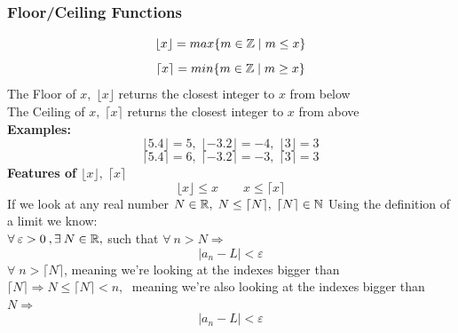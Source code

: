 \subsubsection{Floor/Ceiling Functions}
\[
    \lfloor x\rfloor = max\{m\in \mathbb{Z}\;|\; m\leq x\}
\]
\[
    \lceil x\rceil = min\{m\in \mathbb{Z}\;|\; m\geq x\}
\]
The Floor of $x,\; \lfloor x\rfloor$ returns the closest integer to $x$ from below\\
The Ceiling of $x,\; \lceil x\rceil$ returns the closest integer to $x$ from above\\
\textbf{Examples:}\\
\[
    \lfloor 5.4\rfloor = 5,\; \lfloor -3.2\rfloor = -4,\; \lfloor 3\rfloor = 3
\]
\[
    \lceil 5.4\rceil = 6,\; \lceil -3.2\rceil = -3,\; \lceil 3\rceil = 3
\]
\textbf{Features of $\lfloor x\rfloor,\; \lceil x\rceil$}\\
\[
    \lfloor x\rfloor\leq x \qquad x\leq\lceil x\rceil
\]
If we look at any real number $N\in \mathbb{R},\; N\leq \lceil N\rceil,\; \lceil N\rceil\in \mathbb{N}$
Using the definition of a limit we know:\\
$\forall\: \varepsilon>0 \:, \exists \: N\in \mathbb{R},$ such that $\forall \: n>N \Longrightarrow$\\
\[
    |a_n-L|<\varepsilon
\]
$\forall\; n>\lceil N\rceil$, meaning we're looking at the indexes bigger than $\lceil N\rceil\Longrightarrow N\leq\lceil N\rceil<n,\;$ meaning we're also looking at the indexes bigger than $N\Longrightarrow$\\
\[
    |a_n-L|<\varepsilon
\]

